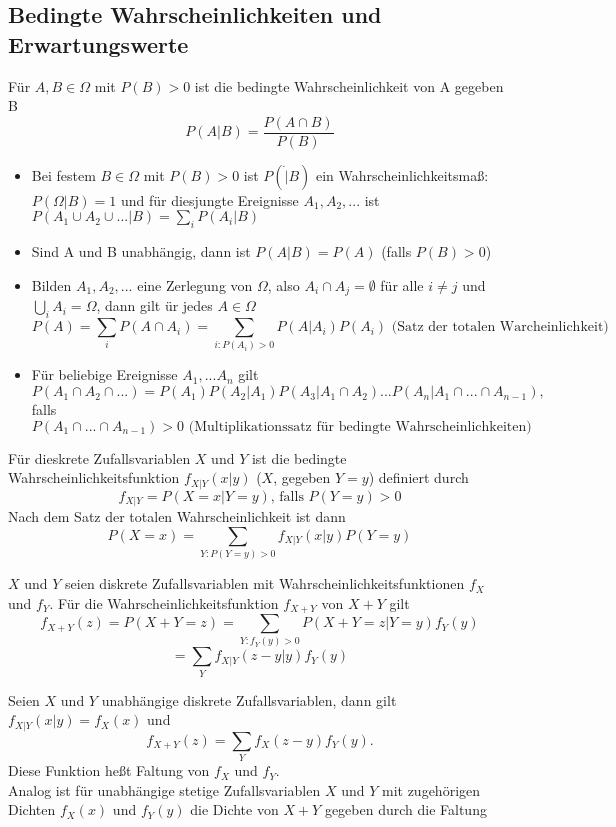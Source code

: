 \documentclass[a4paper,12pt]{article}
\begin{document}
\subsection{Bedingte Wahrscheinlichkeiten und Erwartungswerte}
Für $A,B \in \Omega $ mit $P(B)>0$ ist die bedingte Wahrscheinlichkeit von A gegeben B
$$
	P(A|B) = \frac{P(A \cap B)}{P(B)}
$$
\begin{itemize}
	\item Bei festem $B\in \Omega$ mit $P(B)>0$ ist $P(\dot|B)$ ein Wahrscheinlichkeitsmaß: $P(\Omega | B) = 1$ und für diesjungte Ereignisse $A_1, A_2, ...$ ist $P(A_1 \cup A_2 \cup ... | B) = \sum_{i}P(A_i|B)$
	\item Sind A und B unabhängig, dann ist $P(A|B) = P(A)$ (falls $P(B)>0$)
	\item Bilden $A_1, A_2, ...$ eine Zerlegung von $\Omega$, also $A_i \cap A_j = \emptyset$ für alle $i \neq j$ und $\bigcup_iA_i = \Omega$, dann gilt ür jedes $A \in \Omega$
	      $$P(A) = \sum_{i}P(A \cap A_i) = \sum_{i: P(A_i) > 0}P(A|A_i)P(A_i) \text{ (Satz der totalen Warcheinlichkeit) } $$
	\item Für beliebige Ereignisse $A_1, ... A_n$ gilt
	      $$
		      P(A_1 \cap A_2 \cap ...) = P(A_1)P(A_2|A_1)P(A_3|A_1\cap A_2)...P(A_n | A_1 \cap ... \cap A_{n-1}), $$falls  $$ P(A_1 \cap ... \cap A_{n-1}) > 0 \text{ (Multiplikationssatz für bedingte Wahrscheinlichkeiten) }
	      $$
\end{itemize}
Für dieskrete Zufallsvariablen $X$ und $Y$ ist die bedingte Wahrscheinlichkeitsfunktion $f_{X|Y}(x|y)$ ($X$, gegeben $Y=y$) definiert durch
$$
	f_{X|Y} = P(X=x|Y=y) \text{, falls } P(Y=y) > 0
$$
Nach dem Satz der totalen Wahrscheinlichkeit ist dann
$$
	P(X=x) = \sum_{Y: P(Y=y)>0} f_{X|Y}(x|y)P(Y=y)
$$
\begin{tcolorbox}[breakable, colframe=blue, colback=white, title=Beispiel 1]
	$X$ und $Y$ seien diskrete Zufallsvariablen mit Wahrscheinlichkeitsfunktionen $f_X$ und $f_Y$. Für die Wahrscheinlichkeitsfunktion $f_{X+Y}$ von $X+Y$ gilt
	$$
		f_{X+Y}(z) = P(X+Y = z) = \sum_{Y: f_Y(y)>0}P(X+Y=z|Y=y)f_Y(y) $$ $$ = \sum_{Y} f_{X|Y}(z-y|y)f_Y(y)
	$$
\end{tcolorbox}
Seien $X$ und $Y$ unabhängige diskrete Zufallsvariablen, dann gilt
$
	f_{X|Y}(x|y) = f_X(x)
$ und
$$
	f_{X+Y}(z) = \sum_{Y} f_{X}(z-y)f_Y(y)
	.$$
Diese Funktion heßt Faltung von $f_X$ und $f_Y$.\\
Analog ist für unabhängige stetige Zufallsvariablen $X$ und $Y$ mit zugehörigen Dichten $f_X(x)$ und $f_Y(y)$ die Dichte von $X+Y$ gegeben durch die Faltung
\end{document}
